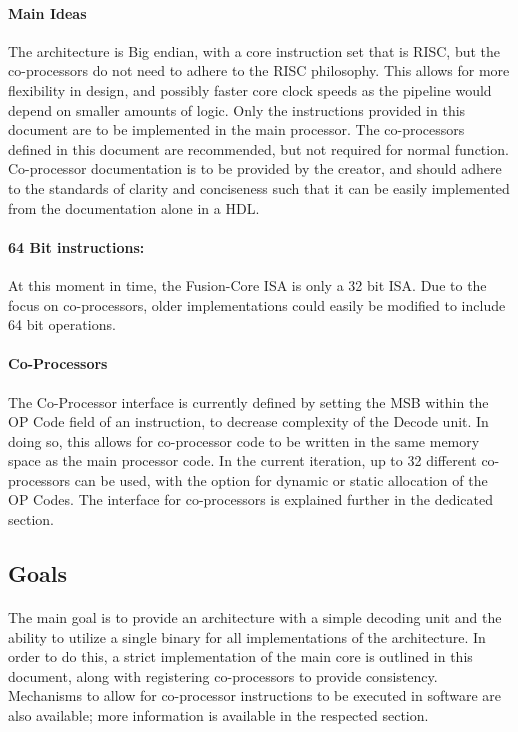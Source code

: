 \documentclass[letterpaper, 11pt]{article}
\begin{document}
\paragraph{Main Ideas}The architecture is Big endian, with a core instruction set that is RISC, but the co-processors do not need to adhere to the RISC philosophy. This allows for more flexibility in design, and possibly faster core clock speeds as the pipeline would depend on smaller amounts of logic. Only the instructions provided in this document are to be implemented in the main processor. The co-processors defined in this document are recommended, but not required for normal function. Co-processor documentation is to be provided by the creator, and should adhere to the standards of clarity and conciseness such that it can be easily implemented from the documentation alone in a HDL. 
\paragraph{64 Bit instructions:}At this moment in time, the Fusion-Core ISA is only a 32 bit ISA. Due to the focus on co-processors,
older implementations could easily be modified to include 64 bit operations.
\paragraph{Co-Processors}The Co-Processor interface is currently defined by setting the MSB within the OP Code field of 
an instruction, to decrease complexity of the Decode unit. In doing so, this allows for co-processor code to be written in the same memory space as the main processor code. In the current iteration, up to 32 different co-processors can be used, with the option for dynamic or static allocation of the OP Codes. The interface for co-processors is explained further in the dedicated section.

\subsection{Goals}
\paragraph{}The main goal is to provide an architecture with a simple decoding unit and the ability to utilize a single binary for all implementations of the architecture.
In order to do this, a strict implementation of the main core is outlined in this document, along with registering co-processors to provide consistency. 
Mechanisms to allow for co-processor instructions to be executed in software are also available; more information is available in the respected section.
\end{document}
